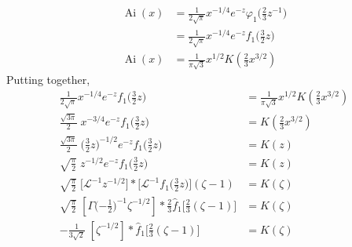 \documentclass{article}
\theoremstyle{definition}
\theoremstyle{plain}
\newcommand{\laplace}{\mathcal{L}}
\DeclareMathOperator{\Ai}{Ai}
\begin{document}
\begin{align*}
\Ai(x) & = \tfrac{1}{2\sqrt{\pi}} x^{-1/4} e^{-z} \varphi_1\big(\tfrac{2}{3} z^{-1}\big) \\
& = \tfrac{1}{2\sqrt{\pi}} x^{-1/4} e^{-z} f_1\big(\tfrac{3}{2} z\big) \\
\Ai(x) & = \frac{1}{\pi\sqrt{3}} x^{1/2} K(\tfrac{2}{3} x^{3/2})
\end{align*}
Putting together,
\begin{align*}
\tfrac{1}{2\sqrt{\pi}} x^{-1/4} e^{-z} f_1\big(\tfrac{3}{2} z\big) & = \frac{1}{\pi\sqrt{3}} x^{1/2} K(\tfrac{2}{3} x^{3/2}) \\
\tfrac{\sqrt{3\pi}}{2}\;x^{-3/4} e^{-z} f_1\big(\tfrac{3}{2} z\big) & = K(\tfrac{2}{3} x^{3/2}) \\
\tfrac{\sqrt{3\pi}}{2}\;\big(\tfrac{3}{2} z)^{-1/2} e^{-z} f_1\big(\tfrac{3}{2} z\big) & = K(z) \\
\sqrt{\tfrac{\pi}{2}}\;z^{-1/2} e^{-z} f_1\big(\tfrac{3}{2} z\big) & = K(z) \\
\sqrt{\tfrac{\pi}{2}}\;\big[\laplace^{-1} z^{-1/2}\big] * \big[\laplace^{-1} f_1\big(\tfrac{3}{2} z\big)\big](\zeta - 1) & = \hat{K}(\zeta) \\
\sqrt{\tfrac{\pi}{2}}\;\left[\Gamma\big({-\tfrac{1}{2}}\big)^{-1} \zeta^{-1/2}\right] * \tfrac{2}{3} \hat{f}_1\big[\tfrac{2}{3}(\zeta - 1)\big] & = \hat{K}(\zeta) \\
-\tfrac{1}{3\sqrt{2}}\;\left[\zeta^{-1/2}\right] * \hat{f}_1\big[\tfrac{2}{3}(\zeta - 1)\big] & = \hat{K}(\zeta) \\
\end{align*}
\end{document}
